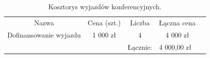 \documentclass{article}
\begin{document}
\begin{table}[!htbp]
\centering
\caption{Kosztorys wyjazdów konferencyjnych.}
\begin{tabular}{lllll}
\cline{1-4}
\multicolumn{1}{|c|}{Nazwa}                     & \multicolumn{1}{c|}{Cena (szt.)} & \multicolumn{1}{c|}{Liczba} & \multicolumn{1}{c|}{Łączna cena} &  \\ \cline{1-4}
\multicolumn{1}{|c|}{Dofinansowanie wyjazdu} & \multicolumn{1}{c|}{1 000 zł}    
 & \multicolumn{1}{c|}{4}      & \multicolumn{1}{c|}{4 000 zł}     &  \\ 
\cline{1-4}
                                                &                                
  & Łącznie:                    & 4 000,00 zł                          & 
\end{tabular}
\end{table}


 

\end{document}
